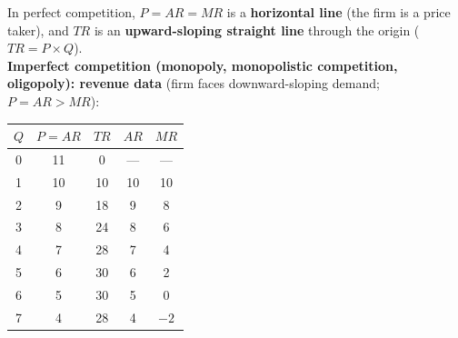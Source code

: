\documentclass[a4paper,12pt]{article}
\begin{document}
In perfect competition, $P = AR = MR$ is a \textbf{horizontal line} (the firm is a price taker), and $TR$ is an \textbf{upward-sloping straight line} through the origin ($TR = P \times Q$).\\
\textbf{Imperfect competition (monopoly, monopolistic competition, oligopoly): revenue data} (firm faces downward-sloping demand; $P = AR > MR$):
\begin{center}
\begin{tabular}{ccccc}
\toprule
$Q$ & $P = AR$ & $TR$ & $AR$ & $MR$ \\
\midrule
0 & 11 & 0  & --- & --- \\
1 & 10 & 10 & 10 & 10 \\
2 & 9  & 18 & 9  & 8 \\
3 & 8  & 24 & 8  & 6 \\
4 & 7  & 28 & 7  & 4 \\
5 & 6  & 30 & 6  & 2 \\
6 & 5  & 30 & 5  & 0 \\
7 & 4  & 28 & 4  & $-2$ \\
\bottomrule
\end{tabular}
\end{center}
\begin{center}
\end{center}
\end{document}
